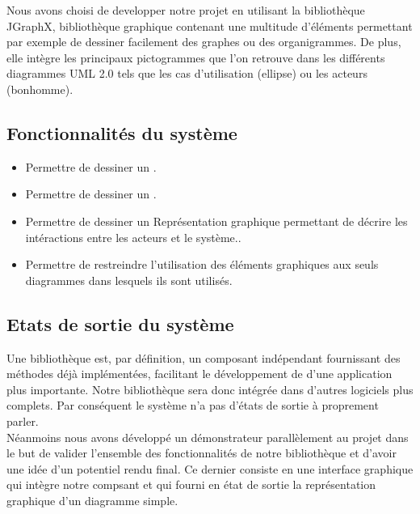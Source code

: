 \documentclass[12pt,a4paper,openany]{report}
\begin{document}
	Nous avons choisi de developper notre projet en utilisant la bibliothèque JGraphX,
	bibliothèque graphique contenant une multitude d'éléments permettant
	par exemple de dessiner facilement des graphes ou des organigrammes. De plus, elle intègre les principaux 
	pictogrammes que l'on retrouve dans les différents diagrammes UML 2.0 tels que les cas d'utilisation (ellipse)
	ou les acteurs (bonhomme).

	\subsection{Fonctionnalités du système}
	\begin{itemize}
		\item Permettre de dessiner un .
		\item Permettre de dessiner un .
		\item Permettre de dessiner un 
			{Représentation graphique permettant de décrire les intéractions entre les acteurs et le système.}.
		\item Permettre de restreindre l'utilisation des éléments graphiques aux seuls diagrammes dans lesquels ils sont utilisés.
	\end{itemize}
	\subsection{Etats de sortie du système}
	Une bibliothèque est, par définition, un composant indépendant fournissant des méthodes déjà implémentées,
	facilitant le développement de d'une application plus importante. Notre bibliothèque sera donc intégrée dans d'autres logiciels
	plus complets.  Par conséquent le système n'a pas d'états de sortie à proprement parler.\\
	Néanmoins nous avons développé un démonstrateur parallèlement au projet dans le but de valider l'ensemble
	des fonctionnalités de notre bibliothèque et d'avoir une idée d'un potentiel rendu final.
	Ce dernier consiste en une interface graphique qui intègre notre compsant et qui fourni en 
	état de sortie la représentation graphique d'un diagramme simple.
\end{document}
